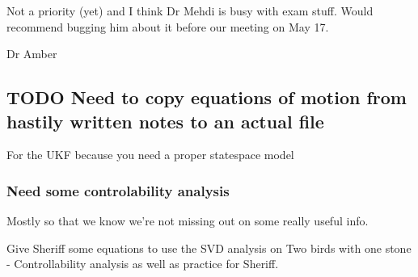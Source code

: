 \documentclass[unrestricted]{meetingnotesminutes}
\begin{document}
Not a priority (yet) and I think Dr Mehdi is busy with exam stuff. Would recommend bugging him about it before our meeting on May 17.

Dr Amber

\subsection{{\bfseries\sffamily TODO} Need to copy equations of motion from hastily written notes to an actual file}
\label{sec:orgf7387f1}

For the UKF because you need a proper statespace model

\subsubsection{Need some controlability analysis}
\label{sec:org798c3cd}

Mostly so that we know we're not missing out on some really useful info.

Give Sheriff some equations to use the SVD analysis on
Two birds with one stone - Controllability analysis as well as practice for Sheriff.
\end{document}
